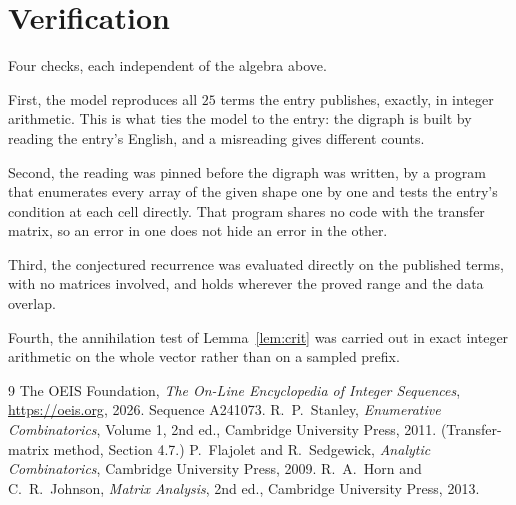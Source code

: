 \documentclass[11pt,a4paper]{article}
\theoremstyle{plain}
\theoremstyle{definition}
\begin{document}
\section{Verification}

Four checks, each independent of the algebra above.

First, the model reproduces all $25$ terms the entry publishes, exactly, in integer
arithmetic. This is what ties the model to the entry: the digraph is built by reading the
entry's English, and a misreading gives different counts.

Second, the reading was pinned before the digraph was written, by a program that enumerates
every array of the given shape one by one and tests the entry's condition at each cell
directly. That program shares no code with the transfer matrix, so an error in one does not
hide an error in the other.

Third, the conjectured recurrence was evaluated directly on the published terms, with no
matrices involved, and holds wherever the proved range and the data overlap.

Fourth, the annihilation test of Lemma~\ref{lem:crit} was carried out in exact integer
arithmetic on the whole vector rather than on a sampled prefix.

\begin{thebibliography}{9}
 The OEIS Foundation, \emph{The On-Line Encyclopedia of Integer
Sequences}, \url{https://oeis.org}, 2026. Sequence A241073.
 R.~P.~Stanley, \emph{Enumerative Combinatorics}, Volume 1, 2nd ed.,
Cambridge University Press, 2011. (Transfer-matrix method, Section 4.7.)
 P.~Flajolet and R.~Sedgewick, \emph{Analytic Combinatorics}, Cambridge
University Press, 2009.
 R.~A.~Horn and C.~R.~Johnson, \emph{Matrix Analysis}, 2nd ed., Cambridge
University Press, 2013.
\end{thebibliography}
\end{document}
